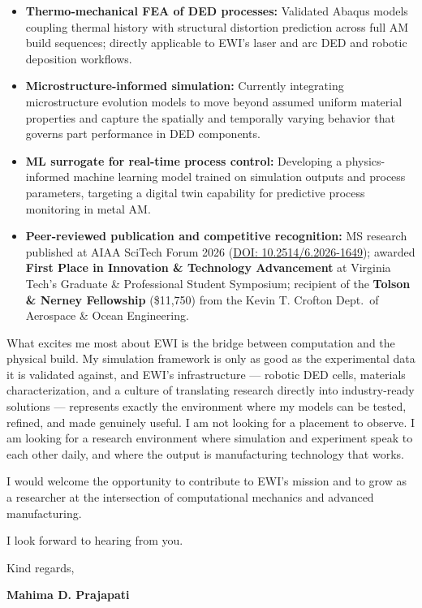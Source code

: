 \documentclass[11pt, a4paper]{article}
\begin{document}
\begin{itemize}[leftmargin=1.5em, itemsep=3pt]
    \item \textbf{Thermo-mechanical FEA of DED processes:} Validated Abaqus models coupling thermal history with structural distortion prediction across full AM build sequences; directly applicable to EWI's laser and arc DED and robotic deposition workflows.
    \item \textbf{Microstructure-informed simulation:} Currently integrating microstructure evolution models to move beyond assumed uniform material properties and capture the spatially and temporally varying behavior that governs part performance in DED components.
    \item \textbf{ML surrogate for real-time process control:} Developing a physics-informed machine learning model trained on simulation outputs and process parameters, targeting a digital twin capability for predictive process monitoring in metal AM.
    \item \textbf{Peer-reviewed publication and competitive recognition:} MS research published at AIAA SciTech Forum 2026 (\href{https://doi.org/10.2514/6.2026-1649}{DOI: 10.2514/6.2026-1649}); awarded \textbf{First Place in Innovation \& Technology Advancement} at Virginia Tech's Graduate \& Professional Student Symposium; recipient of the \textbf{Tolson \& Nerney Fellowship} (\$11,750) from the Kevin T. Crofton Dept.\ of Aerospace \& Ocean Engineering.
\end{itemize}

What excites me most about EWI is the bridge between computation and the physical build. My simulation framework is only as good as the experimental data it is validated against, and EWI's infrastructure --- robotic DED cells, materials characterization, and a culture of translating research directly into industry-ready solutions --- represents exactly the environment where my models can be tested, refined, and made genuinely useful. I am not looking for a placement to observe. I am looking for a research environment where simulation and experiment speak to each other daily, and where the output is manufacturing technology that works.

I would welcome the opportunity to contribute to EWI's mission and to grow as a researcher at the intersection of computational mechanics and advanced manufacturing.

I look forward to hearing from you.

\vspace{16pt}
Kind regards,

\vspace{32pt}
\textbf{Mahima D. Prajapati}
\end{document}
